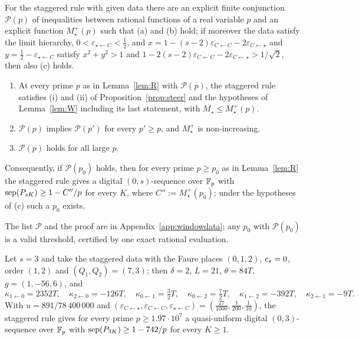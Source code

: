 \begin{proposition}[Threshold]\label{prop:P0}
For the staggered rule with given data there are an explicit finite conjunction $\mathcal P(p)$ of inequalities between rational functions of a real variable $p$ and an explicit function $M_\star^+(p)$ such that (a) and (b) hold; if moreover the data satisfy the limit hierarchy, $0<\varepsilon_{\star\leftarrow C}<\frac12$, and $x=1-(s-2)\varepsilon_{C\leftarrow C}-2\varepsilon_{C\leftarrow\star}$ and $y=\frac12-\varepsilon_{\star\leftarrow C}$ satisfy $x^2+y^2>1$ and $1-2(s-2)\varepsilon_{C\leftarrow C}-2\varepsilon_{C\leftarrow\star}>1/\sqrt2$, then also (c) holds.
\begin{enumerate}
\item[(a)] At every prime $p$ as in Lemma~\ref{lem:R} with $\mathcal P(p)$, the staggered rule satisfies (i) and (ii) of Proposition~\ref{prop:steer} and the hypotheses of Lemma~\ref{lem:W} including its last statement, with $M_\star\le M_\star^+(p)$.
\item[(b)] $\mathcal P(p)$ implies $\mathcal P(p')$ for every $p'\ge p$, and $M_\star^+$ is non-increasing.
\item[(c)] $\mathcal P(p)$ holds for all large $p$.
\end{enumerate}
Consequently, if $\mathcal P(p_0)$ holds, then for every prime $p\ge p_0$ as in Lemma~\ref{lem:R} the staggered rule gives a digital $(0,s)$-sequence over $\mathbb{F}_p$ with $\operatorname{sep}(P_{sK})\ge1-C''/p$ for every $K$, where $C'':=M_\star^+(p_0)$; under the hypotheses of (c) such a $p_0$ exists.
\end{proposition}

The list $\mathcal P$ and the proof are in Appendix~\ref{app:windowdata}; any $p_0$ with $\mathcal P(p_0)$ is a valid threshold, certified by one exact rational evaluation.

\begin{theorem}\label{thm:A3}
Let $s=3$ and take the staggered data with the Faure places $(0,1,2)$, $c_{\star}=0$, order $(1,2)$ and $(Q_1,Q_2)=(7,3)$; then $\delta=2$, $L=21$, $\theta=84T$, $g=(1,-56,6)$, and
\[
\kappa_{1\leftarrow0}=2352T,\quad\kappa_{2\leftarrow0}=-126T,\quad\kappa_{0\leftarrow1}=\tfrac32T,\quad\kappa_{0\leftarrow2}=\tfrac72T,\quad\kappa_{1\leftarrow2}=-392T,\quad\kappa_{2\leftarrow1}=-9T.
\]
With $u=891/78\,400\,000$ and $(\varepsilon_{C\leftarrow\star},\varepsilon_{C\leftarrow C},\varepsilon_{\star\leftarrow C})=(\frac{27}{1000},\frac1{200},\frac1{10})$, the staggered rule gives for every prime $p\ge1.97\cdot10^7$ a quasi-uniform digital $(0,3)$-sequence over $\mathbb{F}_p$ with $\operatorname{sep}(P_{3K})\ge1-742/p$ for every $K\ge1$.
\end{theorem}

